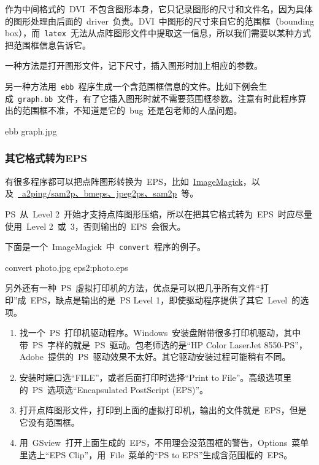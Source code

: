 作为中间格式的~DVI~不包含图形本身，它只记录图形的尺寸和文件名，因为具体的图形处理由后面的~driver~负责。DVI~中图形的尺寸来自它的范围框（bounding box），而~\verb|latex|~无法从点阵图形文件中提取这一信息，所以我们需要以某种方式把范围框信息告诉它。

一种方法是打开图形文件，记下尺寸，插入图形时加上相应的参数。

另一种方法用~\verb|ebb|~程序生成一个含范围框信息的文件。比如下例会生成~\verb|graph.bb|~文件，有了它插入图形时就不需要范围框参数。注意有时此程序算出的范围框不准，不知道是它的~bug~还是包老师的人品问题。
\begin{code}
ebb graph.jpg
\end{code}

\subsubsection{其它格式转为EPS}
有很多程序都可以把点阵图形转换为~EPS，比如~\href{http://www.imagemagick.org/}{ImageMagick}，以及~\href{http://www.tex.ac.uk/cgi-bin/texfaq2html?label=dvipsgraphics}{~a2ping/sam2p、bmeps、jpeg2ps、sam2p}~等。

PS~从~Level 2~开始才支持点阵图形压缩，所以在把其它格式转为~EPS~时应尽量使用~Level 2~或~3，否则输出的~EPS~会很大。

下面是一个~ImageMagick~中~\verb|convert|~程序的例子。
\begin{code}
convert photo.jpg eps2:photo.eps
\end{code}

另外还有一种~PS~虚拟打印机的方法，优点是可以把几乎所有文件“打印”成~EPS，缺点是输出的是~PS Level 1，即使驱动程序提供了其它~Level~的选项。

\begin{enumerate}
\item 找一个~PS~打印机驱动程序。Windows~安装盘附带很多打印机驱动，其中带~PS~字样的就是~PS~驱动。包老师选的是“HP Color LaserJet 8550-PS”，Adobe~提供的~PS~驱动效果不太好。其它驱动安装过程可能稍有不同。
\item 安装时端口选“FILE”，或者后面打印时选择“Print to File”。高级选项里的~PS~选项选“Encapsulated PostScript (EPS)”。
\item 打开点阵图形文件，打印到上面的虚拟打印机，输出的文件就是~EPS，但是它没有范围框。
\item 用~GSview~打开上面生成的~EPS，不用理会没范围框的警告，Options~菜单里选上“EPS Clip”，用~File~菜单的“PS to EPS”生成含范围框的~EPS。
\end{enumerate}

